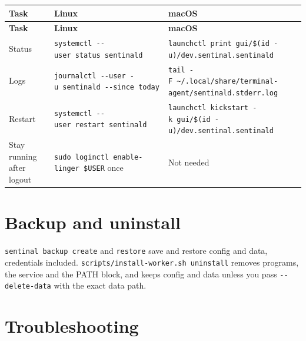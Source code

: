 \begin{small}
\begin{longtable}{>{\raggedright\arraybackslash}p{0.215\dimexpr \linewidth-6\tabcolsep\relax}>{\raggedright\arraybackslash}p{0.351\dimexpr \linewidth-6\tabcolsep\relax}>{\raggedright\arraybackslash}p{0.434\dimexpr \linewidth-6\tabcolsep\relax}}
\toprule
\textbf{Task} & \textbf{Linux} & \textbf{macOS} \\
\midrule
\endfirsthead
\toprule
\textbf{Task} & \textbf{Linux} & \textbf{macOS} \\
\midrule
\endhead
Status & \texttt{systemctl\ -{}\allowbreak{}-{}\allowbreak{}user\ status\ sentinald} & \texttt{launchctl\ print\ gui/\allowbreak{}\$(id\ -{}\allowbreak{}u)/\allowbreak{}dev.\allowbreak{}sentinal.\allowbreak{}sentinald} \\
Logs & \texttt{journalctl\ -{}\allowbreak{}-{}\allowbreak{}user\ -{}\allowbreak{}u\ sentinald\ -{}\allowbreak{}-{}\allowbreak{}since\ today} & \texttt{tail\ -{}\allowbreak{}F\ \textasciitilde{}/\allowbreak{}.\allowbreak{}local/\allowbreak{}share/\allowbreak{}terminal-{}\allowbreak{}agent/\allowbreak{}sentinald.\allowbreak{}stderr.\allowbreak{}log} \\
Restart & \texttt{systemctl\ -{}\allowbreak{}-{}\allowbreak{}user\ restart\ sentinald} & \texttt{launchctl\ kickstart\ -{}\allowbreak{}k\ gui/\allowbreak{}\$(id\ -{}\allowbreak{}u)/\allowbreak{}dev.\allowbreak{}sentinal.\allowbreak{}sentinald} \\
Stay running after logout & \texttt{sudo\ loginctl\ enable-{}\allowbreak{}linger\ \$USER} once & Not needed \\
\bottomrule
\end{longtable}
\end{small}

\section{\texorpdfstring{Backup and uninstall}{Backup and uninstall}}

\texttt{sentinal\ backup\ create} and \texttt{restore} save and restore config and data, credentials included. \texttt{scripts/\allowbreak{}install-{}\allowbreak{}worker.\allowbreak{}sh\ uninstall} removes programs, the service and the PATH block, and keeps config and data unless you pass \texttt{-{}\allowbreak{}-{}\allowbreak{}delete-{}\allowbreak{}data} with the exact data path.

\section{\texorpdfstring{Troubleshooting}{Troubleshooting}}

